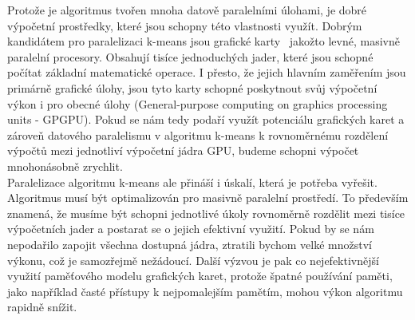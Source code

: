 Protože je algoritmus tvořen mnoha datově paralelními úlohami, je dobré výpočetní prostředky, které jsou schopny této vlastnosti využít.
Dobrým kandidátem pro paralelizaci k-means jsou grafické karty~\cite{Zechner09} jakožto levné, masivně paralelní procesory. Obsahují tisíce jednoduchých jader, které jsou schopné počítat základní matematické operace. I přesto, že jejich hlavním zaměřením jsou primárně grafické úlohy, jsou tyto karty schopné poskytnout svůj výpočetní výkon i pro obecné úlohy (General-purpose computing on graphics processing units - GPGPU). Pokud se nám tedy podaří využít potenciálu grafických karet a zároveň datového paralelismu v algoritmu k-means k rovnoměrnému rozdělení výpočtů mezi jednotliví výpočetní jádra GPU, budeme schopni výpočet mnohonásobně zrychlit.\\

 
Paralelizace algoritmu k-means ale přináší i úskalí, která je potřeba vyřešit. Algoritmus musí být optimalizován pro masivně paralelní prostředí. To především znamená, že musíme být schopni jednotlivé úkoly rovnoměrně rozdělit mezi tisíce výpočetních jader a postarat se o jejich efektivní využití. Pokud by se nám nepodařilo zapojit všechna dostupná jádra, ztratili bychom velké množství výkonu, což je samozřejmě nežádoucí. Další výzvou je pak co nejefektivnější využití paměťového modelu grafických karet, protože špatné používání paměti, jako například časté přístupy k nejpomalejším pamětím, mohou výkon algoritmu rapidně snížit.\\

